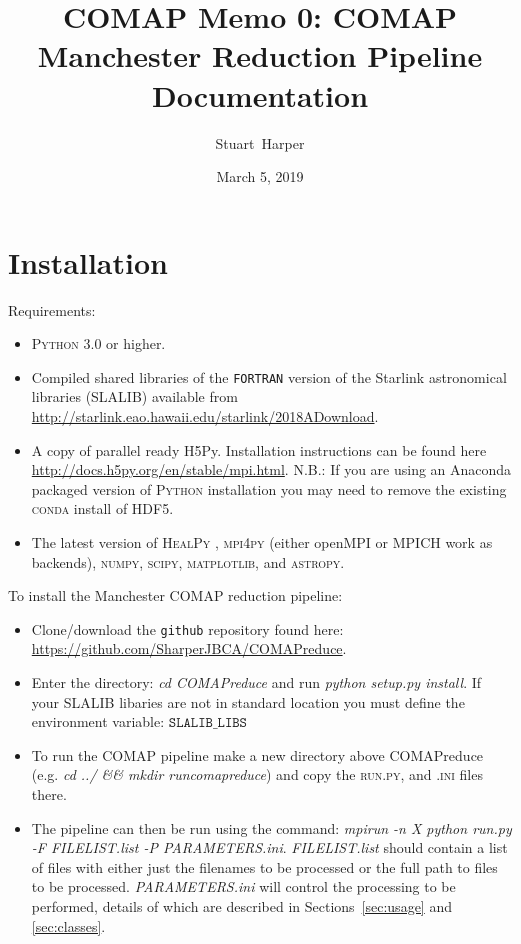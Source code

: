 \documentclass[11pt]{article}
\begin{document}
\title[COMAP reduce docs]{\bf COMAP Memo 0: COMAP Manchester Reduction Pipeline Documentation}
\author{Stuart~Harper}
\date{March 5, 2019}
\setlength{\topmargin}{-15mm}

\maketitle

\tableofcontents
\newpage

\section{Installation}

Requirements:
\begin{itemize}
\item \textsc{Python} 3.0 or higher.
\item Compiled shared libraries of the \texttt{FORTRAN} version of the Starlink astronomical libraries (SLALIB) available from \url{http://starlink.eao.hawaii.edu/starlink/2018ADownload}.
\item A copy of parallel ready H5Py. Installation instructions can be found here \url{http://docs.h5py.org/en/stable/mpi.html}. N.B.: If you are using an Anaconda packaged version of \textsc{Python} installation you may need to remove the existing \textsc{conda} install of HDF5.
\item The latest version of \textsc{HealPy} , \textsc{mpi4py} (either openMPI or MPICH work as backends), \textsc{numpy}, \textsc{scipy}, \textsc{matplotlib}, and \textsc{astropy}.
\end{itemize}

To install the Manchester COMAP reduction pipeline:
\begin{itemize}
  \item Clone/download the \texttt{github} repository found here: \url{https://github.com/SharperJBCA/COMAPreduce}.
  \item Enter the directory: \textit{cd COMAPreduce} and run \textit{python setup.py install}. If your SLALIB libaries are not in standard location you must define the environment variable: $\texttt{SLALIB\_LIBS}$
  \item To run the COMAP pipeline make a new directory above COMAPreduce (e.g. \textit{cd ../ \&\& mkdir runcomapreduce}) and copy the \textsc{run.py}, and \textsc{\*.ini} files there.
  \item The pipeline can then be run using the command: \textit{mpirun -n X python run.py -F FILELIST.list -P PARAMETERS.ini}. \textit{FILELIST.list} should contain a list of files with either just the filenames to be processed or the full path to files to be processed. \textit{PARAMETERS.ini} will control the processing to be performed, details of which are described in Sections~\ref{sec:usage} and \ref{sec:classes}.
\end{itemize}
\end{document}
